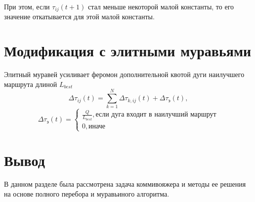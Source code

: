 При этом, если $\tau_{ij}(t+1)$ стал меньше некоторой малой константы, то его значение откатывается для этой малой константы.

\section{Модификация с элитными муравьями}
Элитный муравей усиливает феромон дополнительной квотой дуги наилучшего маршрута длиной $L_{best}$
\begin{equation}
	\Delta \tau_{ij}(t) = \sum_{k=1}^N \Delta \tau_{k,ij}(t) + \Delta \tau_{э}(t),
\end{equation}
\begin{equation}
	\Delta \tau_{э}(t) = \begin{cases}
		\frac{Q}{L_{best}}, \textrm{если дуга входит в наилучший маршрут} \\
		0, \textrm{иначе}
	\end{cases}
\end{equation}

\section*{Вывод}
В данном разделе была рассмотрена задача коммивояжера и методы ее решения на основе полного перебора и муравьиного алгоритма.
\clearpage
